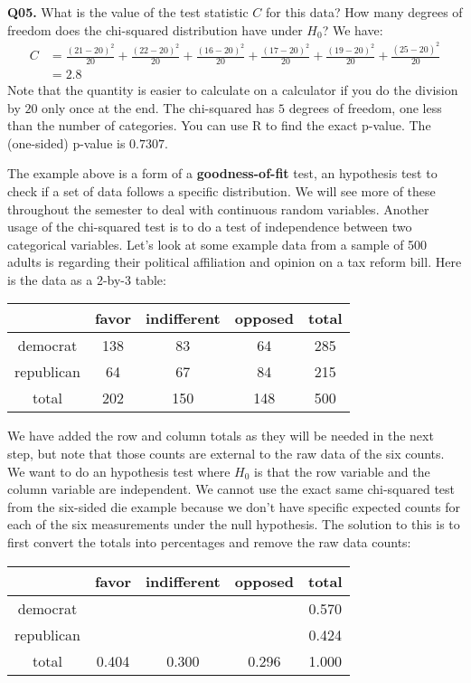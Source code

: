 \documentclass[12pt]{article}
\newcommand{\cblack}{\color{Black}}
\newcommand{\cblue}{\color{MidnightBlue}}
\begin{document}
\textbf{Q05.} What is the value of the test statistic $C$ for this data? How many
degrees of freedom does the chi-squared distribution have under $H_0$? \cblue We
have:
\begin{align*}
C &= \frac{(21 - 20)^2}{20} + \frac{(22 - 20)^2}{20} + \frac{(16 - 20)^2}{20} +
     \frac{(17 - 20)^2}{20} + \frac{(19 - 20)^2}{20} + \frac{(25 - 20)^2}{20} \\
  &= 2.8
\end{align*}
Note that the quantity is easier to calculate on a calculator if you do the division
by $20$ only once at the end. The chi-squared has $5$ degrees of freedom, one less than
the number of categories. \cblack You can use R to find the exact p-value. The (one-sided)
p-value is $0.7307$.

The example above is a form of a \textbf{goodness-of-fit} test, an hypothesis test to
check if a set of data follows a specific distribution. We will see more of these 
throughout the semester to deal with continuous random variables. Another usage of
the chi-squared test is to do a test of independence between two categorical variables.
Let's look at some example data from a sample of 500 adults is regarding their political
affiliation and opinion on a tax reform bill. Here is the data as a 2-by-3 table:
\begin{center}
\begin{tabular}{*5c}
           & favor & indifferent & opposed & total \\ \hline
democrat   & 138   & 83          & 64      & 285 \\
republican & 64    & 67          & 84      & 215 \\
total      & 202   & 150         & 148     & 500 
\end{tabular}
\end{center}
We have added the row and column totals as they will be needed in the next step, but 
note that those counts are external to the raw data of the six counts. We want to
do an hypothesis test where $H_0$ is that the row variable and the column variable
are independent. We cannot use the exact same chi-squared test from the six-sided
die example because we don't have specific expected counts for each of the six 
measurements under the null hypothesis. The solution to this is to first convert
the totals into percentages and remove the raw data counts:
\begin{center}
\begin{tabular}{*5c}
           & favor   & indifferent   & opposed   & total \\ \hline
democrat   &         &               &           & 0.570 \\
republican &         &               &           & 0.424 \\
total      & 0.404   & 0.300         & 0.296     & 1.000
\end{tabular}
\end{center}
\end{document}
